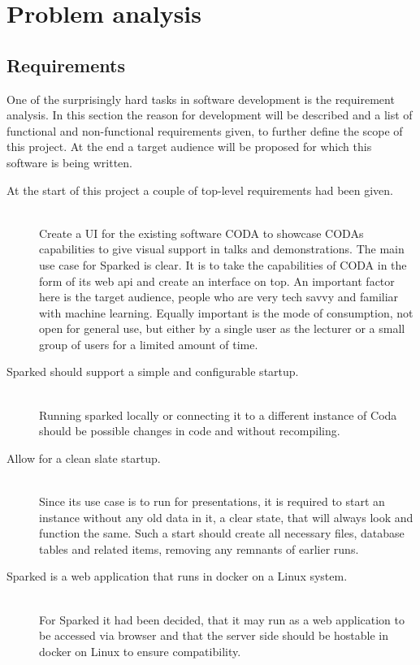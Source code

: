 \chapter{Problem analysis}

\section{Requirements}
One of the surprisingly hard tasks in software development is the requirement analysis. In this section the reason for development will be described and a list of functional and non-functional requirements given, to further define the scope of this project. At the end a target audience will be proposed for which this software is being written. 

\begin{description}
\item [At the start of this project a couple of top-level requirements had been given.]\hfill \\
Create a UI for the existing software CODA to showcase CODAs capabilities to give visual support in talks and demonstrations.
The main use case for Sparked is clear. It is to take the capabilities of CODA in the form of its web api and create an interface on top. An important factor here is the target audience, people who are very tech savvy and familiar with machine learning. Equally important is the mode of consumption, not open for general use, but either by a single user as the lecturer or a small group of users for a limited amount of time. 
\end{description}


\begin{description}
\item [Sparked should support a simple and configurable startup.]\hfill \\
Running sparked locally or connecting it to a different instance of Coda should be possible changes in code and without recompiling.
\item [Allow for a clean slate startup.]\hfill \\
Since its use case is to run for presentations, it is required to start an instance without any old data in it, a clear state, that will always look and function the same. Such a start should create all necessary files, database tables and related items, removing any remnants of earlier runs.
\end{description}

\begin{description}
\item [Sparked is a web application that runs in docker on a Linux system.]\hfill \\
For Sparked it had been decided, that it may run as a web application to be accessed via browser and that the server side should be hostable in docker on Linux to ensure compatibility.
\end{description}

